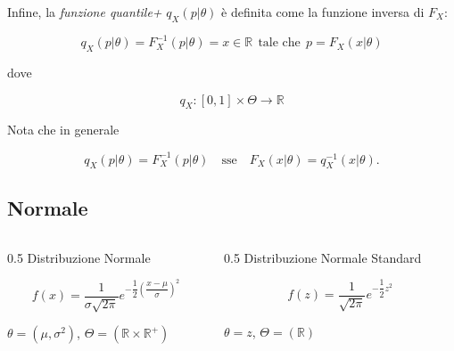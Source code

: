 \documentclass[
  ignorenonframetext,
  italian,
  compress, aspectratio=149]{beamer}
\begin{document}
\begin{frame}{}
\label{section-10}
Infine, la \emph{funzione quantile+} \(q_X(p|\theta)\) è definita come
la funzione inversa di \(F_X\):

\[q_X(p|\theta) = F_X^{-1}(p|\theta)
= x \in \mathbb{R} \ \ \text{tale che} \ \ p = F_X(x|\theta)\]

dove

\[q_X : [0,1] \times \Theta \to \mathbb{R}\]

Nota che in generale

\[q_X(p|\theta) = F_X^{-1}(p|\theta) 
\quad \text{sse} \quad 
F_X(x|\theta) = q_X^{-1}(x|\theta).\]
\end{frame}

\subsection{Normale}\label{normale}

\begin{frame}{}
\label{section-11}
\begin{columns}[T]
\begin{column}{0.5\linewidth}
Distribuzione Normale

\[f(x) = {\displaystyle {\dfrac {1}{\sigma {\sqrt {2\pi }}}}e^{-{\dfrac {1}{2}}\left({\dfrac {x-\mu }{\sigma }}\right)^{2}}}\]

\(\theta = (\mu, \sigma^2)\),
\(\Theta = (\mathbb{R} \times \mathbb{R}^+)\)
\end{column}

\begin{column}{0.5\linewidth}
Distribuzione Normale Standard

\[f(z) = \dfrac{1}{\sqrt{2\pi}} e^{-\dfrac{1}{2}z^2}\]

\(\theta = z\), \(\Theta = (\mathbb{R})\)
\end{column}
\end{columns}
\end{frame}
\end{document}
